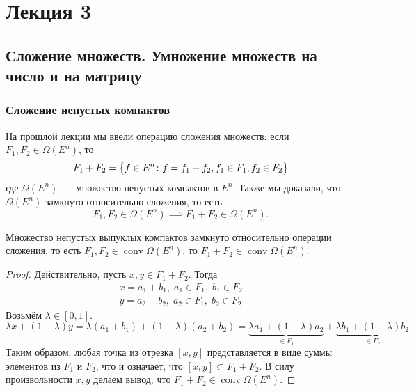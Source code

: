 \section{Лекция 3}

\subsection{Сложение множеств. Умножение множеств на число и на матрицу}

\subsubsection{Сложение непустых компактов}

На прошлой лекции мы ввели операцию сложения множеств:
если $F_{1}, F_{2} \in \Omega(E^{n})$, то 
\begin{equation*}
    F_{1} + F_{2} = \bigl\{ f \in E^{n}\colon f = f_1 + f_2, f_1 \in F_1, f_2 \in F_2 \bigr\}
\end{equation*}
где $\Omega(E^{n})$~--- множество непустых компактов в $E^{n}$.
Также мы доказали, что $\Omega(E^{n})$ замкнуто относительно сложения, то есть
\begin{equation*}
    F_{1}, F_{2} \in \Omega(E^{n}) \implies F_{1} + F_{2} \in \Omega(E^{n}).
\end{equation*}

\begin{thm*}
    Множество непустых выпуклых компактов замкнуто относительно операции сложения, 
    то есть $F_{1}, F_{2} \in \operatorname{conv} \Omega(E^{n})$, то $F_{1} + F_{2} \in \operatorname{conv} \Omega(E^{n})$.
\end{thm*}
\begin{proof}
    Действительно, пусть $x, y \in F_1 + F_2$.
    Тогда 
    \begin{align*}
        x = a_1 + b_1, \; a_1 \in F_1,\; b_1 \in F_2 \\
        y = a_2 + b_2, \; a_2 \in F_1,\; b_2 \in F_2
    \end{align*}
    Возьмём $\lambda \in [0, 1]$.
    \begin{equation*}
        \lambda x + (1 - \lambda)y = 
        \lambda(a_1 + b_1) + (1 - \lambda)(a_2 + b_2) =
        \underbrace{\lambda a_1 + (1 - \lambda) a_2}_{\in F_1} + \underbrace{\lambda b_1 + (1 - \lambda)b_2}_{\in F_2}
    \end{equation*}
    Таким образом, любая точка из отрезка $[x, y]$ представляется в виде суммы элементов из $F_1$ и $F_2$, что и означает, что $[x, y] \subset F_1 + F_2$.
    В силу произвольности $x, y$ делаем вывод, что $F_1 + F_2 \in \operatorname{conv} \Omega(E^n)$.
\end{proof}

